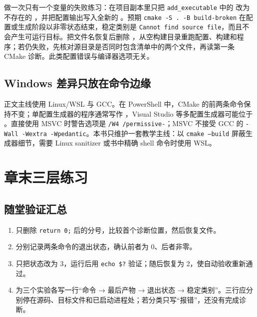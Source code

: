 做一次只有一个变量的失败练习：在项目副本里只把 \texttt{add\_executable} 中的  改为不存在的 ，并把配置输出写入全新的 。预期 \texttt{cmake -S . -B build-broken} 在配置或生成阶段以非零状态结束，稳定类别是 \texttt{Cannot find source file}，而且不会产生可运行目标。把文件名恢复后删除 ，从空构建目录重跑配置、构建和程序；若仍失败，先核对源目录是否同时包含清单中的两个文件，再读第一条 CMake 诊断。此类配置错误与编译器选项无关。

\subsection{Windows 差异只放在命令边缘}

正文主线使用 Linux/WSL 与 GCC。在 PowerShell 中，CMake 的前两条命令保持不变；单配置生成器的程序通常写作 ，Visual Studio 等多配置生成器可能位于 。直接使用 MSVC 时警告选项是 \texttt{/W4 /permissive-}；MSVC 不接受 GCC 的 \texttt{-Wall -Wextra -Wpedantic}。本书只维护一套教学主线：以 \texttt{cmake --build} 屏蔽生成器细节，需要 Linux sanitizer 或书中精确 shell 命令时使用 WSL。

\section{章末三层练习}

\subsection*{随堂验证汇总}

\begin{enumerate}
  \item 只删除 \texttt{return 0;} 后的分号，比较首个诊断位置，然后恢复文件。
  \item 分别记录两条命令的退出状态，确认前者为 0、后者非零。
  \item 只把状态改为 3，运行后用 \texttt{echo \$?} 验证；随后恢复为 2，使自动验收重新通过。
  \item 为三个实验各写一行“命令 → 最后产物 → 退出状态 → 稳定类别”。三行应分别停在源码、目标文件和已启动进程处；若分类只写“报错”，还没有完成诊断。
\end{enumerate}

